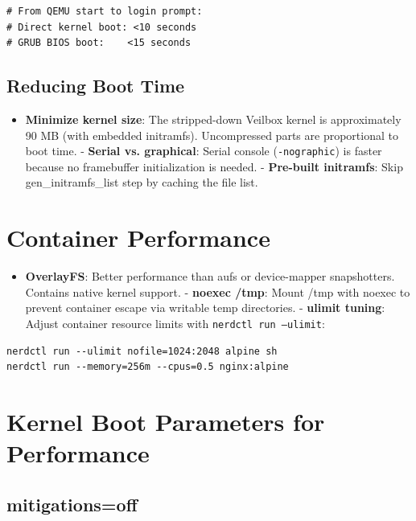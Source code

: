 \begin{lstlisting}
# From QEMU start to login prompt:
# Direct kernel boot: <10 seconds
# GRUB BIOS boot:    <15 seconds
\end{lstlisting}

\subsection{Reducing Boot Time}

\begin{itemize}[nosep]
  \item \textbf{Minimize kernel size}: The stripped-down Veilbox kernel
        is approximately 90 MB (with embedded initramfs). Uncompressed
        parts are proportional to boot time.
  - \textbf{Serial vs. graphical}: Serial console (\texttt{-nographic})
        is faster because no framebuffer initialization is needed.
  - \textbf{Pre-built initramfs}: Skip gen\_initramfs\_list step by
        caching the file list.
\end{itemize}

\section{Container Performance}

\begin{itemize}[nosep]
  \item \textbf{OverlayFS}: Better performance than aufs or device-mapper
        snapshotters. Contains native kernel support.
  - \textbf{noexec /tmp}: Mount /tmp with noexec to prevent container
        escape via writable temp directories.
  - \textbf{ulimit tuning}: Adjust container resource limits with
        \texttt{nerdctl run --ulimit}:
\end{itemize}

\begin{lstlisting}
nerdctl run --ulimit nofile=1024:2048 alpine sh
nerdctl run --memory=256m --cpus=0.5 nginx:alpine
\end{lstlisting}


\section{Kernel Boot Parameters for Performance}

\subsection{mitigations=off}

